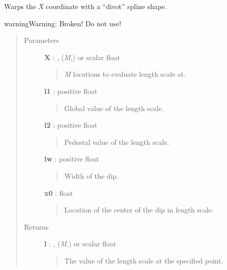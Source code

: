 \documentclass[letterpaper,10pt,english]{sphinxmanual}
\begin{document}

\begin{fulllineitems}
\label{gptools.kernel:gptools.kernel.gibbs.spline_warp}
Warps the \emph{X} coordinate with a ``divot'' spline shape.

\begin{notice}{warning}{Warning:}
Broken! Do not use!
\end{notice}
\begin{quote}\begin{description}
\item[{Parameters }] \leavevmode
\textbf{X} : , (\emph{M},) or scalar float
\begin{quote}

\emph{M} locations to evaluate length scale at.
\end{quote}

\textbf{l1} : positive float
\begin{quote}

Global value of the length scale.
\end{quote}

\textbf{l2} : positive float
\begin{quote}

Pedestal value of the length scale.
\end{quote}

\textbf{lw} : positive float
\begin{quote}

Width of the dip.
\end{quote}

\textbf{x0} : float
\begin{quote}

Location of the center of the dip in length scale.
\end{quote}

\item[{Returns }] \leavevmode
\textbf{l} : , (\emph{M},) or scalar float
\begin{quote}

The value of the length scale at the specified point.
\end{quote}

\end{description}\end{quote}

\end{fulllineitems}
\end{document}
